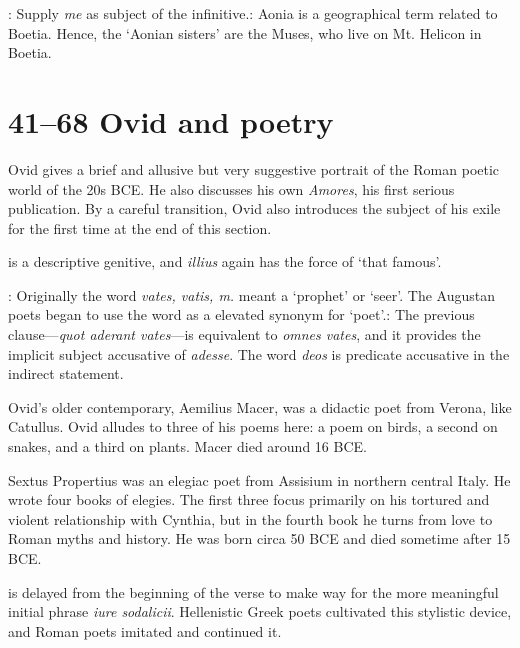 
: Supply \textit{me} as subject of the
infinitive.\indent{}: Aonia is a geographical term
related to Boetia.  Hence, the `Aonian sisters' are the Muses, who live on Mt.
Helicon in Boetia.

\section*{41--68 Ovid and poetry}

Ovid gives a brief and allusive but very suggestive portrait of the Roman
poetic world of the 20s BCE.  He also discusses his own \textit{Amores}, his
first serious publication.  By a careful transition, Ovid also introduces the
subject of his exile for the first time at the end of this section.


 is a descriptive genitive, and \textit{illius} again has
the force of `that famous'.


: Originally the word \textit{vates, vatis, m.} meant a `prophet' or
`seer'.  The Augustan poets began to use the word as a elevated synonym for
`poet'.\indent{}: The previous clause---\textit{quot
aderant vates}---is equivalent to \textit{omnes vates}, and it provides the
implicit subject accusative of \textit{adesse}.  The word \textit{deos} is
predicate accusative in the indirect statement.


Ovid's older contemporary, Aemilius Macer, was a didactic poet from Verona,
like Catullus.  Ovid alludes to three of his poems here: a poem on birds,
a second on snakes, and a third on plants.  Macer died around 16 BCE.


Sextus Propertius was an elegiac poet from Assisium in northern central Italy.
He wrote four books of elegies.  The first three focus primarily on his
tortured and violent relationship with Cynthia, but in the fourth book he turns
from love to Roman myths and history.  He was born circa 50 BCE and died
sometime after 15 BCE.


 is delayed from the beginning of the verse to make way for the more
meaningful initial phrase \textit{iure sodalicii}.  Hellenistic Greek poets
cultivated this stylistic device, and Roman poets imitated and continued it.

